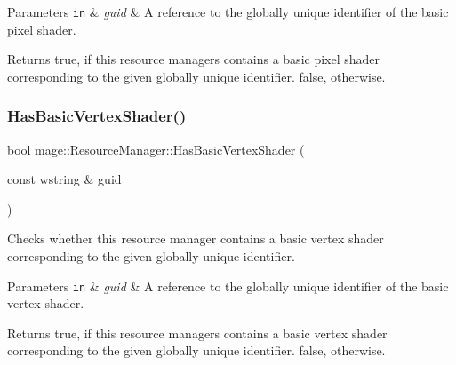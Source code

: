 \begin{DoxyParams}[1]{Parameters}
\mbox{\tt in}  & {\em guid} & A reference to the globally unique identifier of the basic pixel shader. \\
\hline
\end{DoxyParams}
\begin{DoxyReturn}{Returns}
{\ttfamily true}, if this resource managers contains a basic pixel shader corresponding to the given globally unique identifier. {\ttfamily false}, otherwise. 
\end{DoxyReturn}
\hypertarget{classmage_1_1_resource_manager_ab2e83271c42c8250bf0ffe8ec59d5ced}{}\label{classmage_1_1_resource_manager_ab2e83271c42c8250bf0ffe8ec59d5ced} 
\subsubsection{\texorpdfstring{Has\+Basic\+Vertex\+Shader()}{HasBasicVertexShader()}}
{\footnotesize\ttfamily bool mage\+::\+Resource\+Manager\+::\+Has\+Basic\+Vertex\+Shader (\begin{DoxyParamCaption}\item[{const wstring \&}]{guid }\end{DoxyParamCaption})\hspace{0.3cm}{\ttfamily [noexcept]}}

Checks whether this resource manager contains a basic vertex shader corresponding to the given globally unique identifier.


\begin{DoxyParams}[1]{Parameters}
\mbox{\tt in}  & {\em guid} & A reference to the globally unique identifier of the basic vertex shader. \\
\hline
\end{DoxyParams}
\begin{DoxyReturn}{Returns}
{\ttfamily true}, if this resource managers contains a basic vertex shader corresponding to the given globally unique identifier. {\ttfamily false}, otherwise. 
\end{DoxyReturn}
\hypertarget{classmage_1_1_resource_manager_a20913b24e2b86b3c59887f6b071bb020}{}\label{classmage_1_1_resource_manager_a20913b24e2b86b3c59887f6b071bb020} 
